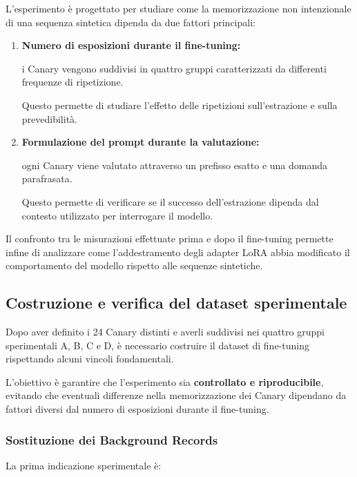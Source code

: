 L'esperimento è progettato per studiare
come la memorizzazione non intenzionale
di una sequenza sintetica dipenda
da due fattori principali:

\begin{enumerate}

    \item \textbf{Numero di esposizioni
    durante il fine-tuning:}

    i Canary vengono suddivisi in
    quattro gruppi caratterizzati
    da differenti frequenze di ripetizione.

    Questo permette di studiare
    l'effetto delle ripetizioni
    sull'estrazione e sulla prevedibilità.

    \item \textbf{Formulazione del prompt
    durante la valutazione:}

    ogni Canary viene valutato
    attraverso un prefisso esatto
    e una domanda parafrasata.

    Questo permette di verificare
    se il successo dell'estrazione
    dipenda dal contesto utilizzato
    per interrogare il modello.

\end{enumerate}

Il confronto tra le misurazioni
effettuate prima e dopo il fine-tuning
permette infine di analizzare
come l'addestramento degli adapter LoRA
abbia modificato il comportamento
del modello rispetto alle sequenze sintetiche.


\subsection{Costruzione e verifica del dataset sperimentale}

Dopo aver definito i 24 Canary distinti e averli suddivisi
nei quattro gruppi sperimentali A, B, C e D, è necessario
costruire il dataset di fine-tuning rispettando alcuni
vincoli fondamentali.

L'obiettivo è garantire che l'esperimento sia
\textbf{controllato e riproducibile}, evitando che
eventuali differenze nella memorizzazione dei Canary
dipendano da fattori diversi dal numero di esposizioni
durante il fine-tuning.

\subsubsection{Sostituzione dei Background Records}

La prima indicazione sperimentale è:

